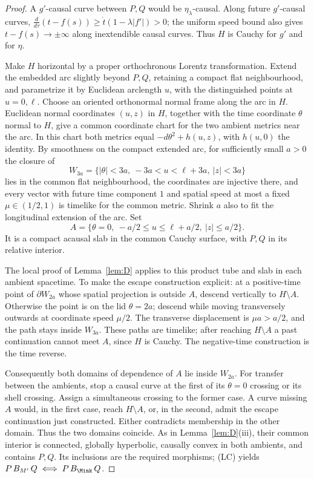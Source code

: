 \begin{proof}
A $g'$-causal curve between $P,Q$ would be $\eta_\lambda$-causal. Along
future $g'$-causal curves,
$\frac{d}{d\tau}(t-f(s))\ge\dot t(1-\lambda|f'|)>0$; the uniform speed
bound also gives $t-f(s)\to\pm\infty$ along inextendible causal curves.
Thus $H$ is Cauchy for $g'$ and for $\eta$.

Make $H$ horizontal by a proper orthochronous Lorentz transformation.
Extend the embedded arc slightly beyond $P,Q$, retaining a compact flat
neighbourhood, and parametrize it by Euclidean arclength $u$, with the
distinguished points at $u=0,\ell$. Choose an oriented orthonormal normal
frame along the arc in $H$. Euclidean normal coordinates $(u,z)$ in $H$,
together with the time coordinate $\theta$ normal to $H$, give a common
coordinate chart for the two ambient metrics near the arc. In this chart
both metrics equal $-d\theta^2+h(u,z)$, with $h(u,0)$ the identity.
By smoothness on the compact extended arc, for sufficiently small $a>0$
the closure of
\[
 W_{3a}=\{|\theta|<3a,\ -3a<u<\ell+3a,\ |z|<3a\}
\]
lies in the common flat neighbourhood, the coordinates are injective
there, and every vector with future time component $1$ and spatial speed
at most a fixed $\mu\in(1/2,1)$ is timelike for the common metric.
Shrink $a$ also to fit the longitudinal extension of the arc. Set
\[
 A=\{\theta=0,\ -a/2\le u\le\ell+a/2,\ |z|\le a/2\}.
\]
It is a compact acausal slab in the common Cauchy surface, with $P,Q$ in
its relative interior.

The local proof of Lemma~\ref{lem:D} applies to this product tube and slab
in each ambient spacetime. To make the escape construction explicit: at
a positive-time point of $\partial W_{2a}$ whose spatial projection is
outside $A$, descend vertically to $H\setminus A$. Otherwise the point is
on the lid $\theta=2a$; descend while moving transversely outwards at
coordinate speed $\mu/2$. The transverse displacement is $\mu a>a/2$,
and the path stays inside $W_{3a}$. These paths are timelike; after reaching
$H\setminus A$ a past continuation cannot meet $A$, since $H$ is Cauchy.
The negative-time construction is the time reverse.

Consequently both domains of dependence of $A$ lie inside $W_{2a}$.
For transfer between the ambients, stop a causal curve at the first of its
$\theta=0$ crossing or its shell crossing. Assign a simultaneous crossing
to the former case. A curve missing $A$ would, in the first case, reach
$H\setminus A$, or, in the second, admit the escape continuation just
constructed. Either contradicts membership in the other domain. Thus the
two domains coincide. As in Lemma~\ref{lem:D}(iii), their common interior
is connected, globally hyperbolic, causally convex in both ambients, and
contains $P,Q$. Its inclusions are the required morphisms; (LC) yields
$P\,B_{M'}\,Q\iff P\,B_\Mink\,Q$.
\end{proof}
